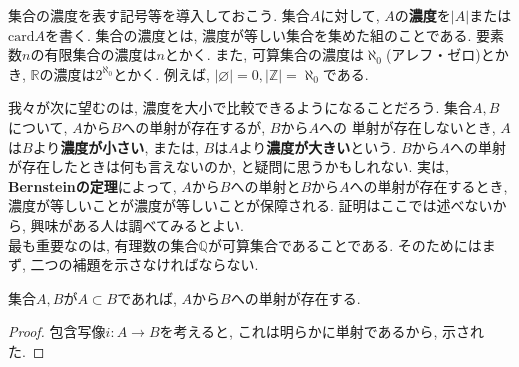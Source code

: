            集合の濃度を表す記号等を導入しておこう. 集合$A$に対して, $A$の\textbf{濃度}を$|A|$または$\mathrm{card}A$を書く.
            集合の濃度とは, 濃度が等しい集合を集めた組のことである. 要素数$n$の有限集合の濃度は$n$とかく. また, 可算集合の濃度は$\aleph_0$(アレフ・ゼロ)とかき,  
            $\mathbb{R}$の濃度は$2^{\aleph_0}$とかく. 例えば, $|\varnothing|=0,|\mathbb{Z}|=\aleph_0$である.
            \clearpage

            我々が次に望むのは, 濃度を大小で比較できるようになることだろう. 集合$A,B$について, $A$から$B$への単射が存在するが, $B$から$A$への
            単射が存在しないとき, $A$は$B$より\textbf{濃度が小さい}, または, $B$は$A$より\textbf{濃度が大きい}という.
            $B$から$A$への単射が存在したときは何も言えないのか, と疑問に思うかもしれない. 実は, \textbf{Bernsteinの定理}によって, $A$から$B$への単射と$B$から$A$への単射が存在するとき, 濃度が等しいことが濃度が等しいことが保障される.
            証明はここでは述べないから, 興味がある人は調べてみるとよい.\\

            最も重要なのは, 有理数の集合$\mathbb{Q}$が可算集合であることである. そのためにはまず, 二つの補題を示さなければならない.
            \begin{screen}
                集合$A,B$が$A\subset B$であれば, $A$から$B$への単射が存在する.
            \end{screen}
            \begin{proof}
                包含写像$i:A\rightarrow B$を考えると, これは明らかに単射であるから, 示された.
            \end{proof}


